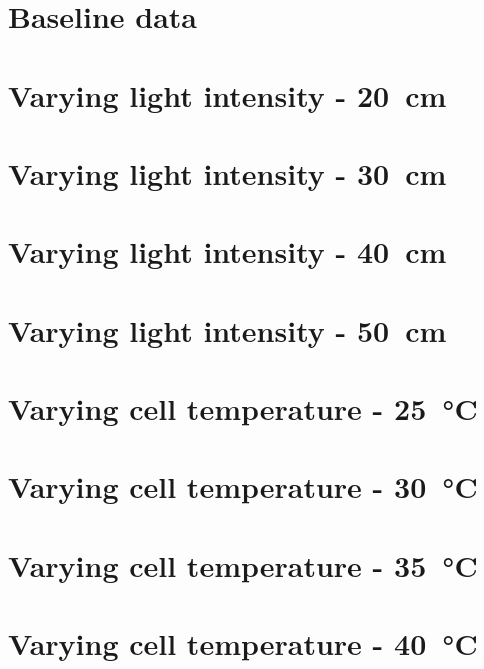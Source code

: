 \documentclass[a4paper,11pt]{article}
\begin{document}
\begin{appendices}
    \label{appendix}
    \section{Baseline data}
    \label{dat:baseline}
    
    \section{Varying light intensity - \SI{20}{\centi\metre}}
    \label{dat:d20}
        
    \section{Varying light intensity - \SI{30}{\centi\metre}}
    \label{dat:d30}
        
    \section{Varying light intensity - \SI{40}{\centi\metre}}
    \label{dat:d40}
        
    \section{Varying light intensity - \SI{50}{\centi\metre}}
    \label{dat:d50}
        
    \section{Varying cell temperature - \SI{25}{\celsius}}
    \label{dat:t25}
        
    \section{Varying cell temperature - \SI{30}{\celsius}}
    \label{dat:t30}
        
    \section{Varying cell temperature - \SI{35}{\celsius}}
    \label{dat:t35}
        
    \section{Varying cell temperature - \SI{40}{\celsius}}
    \label{dat:t40}
\end{appendices}



\end{document}
